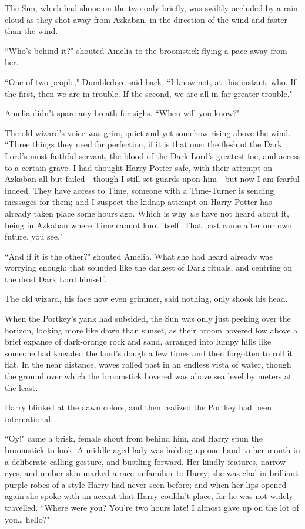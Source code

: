 \later

The Sun, which had shone on the two only briefly, was swiftly occluded by a rain cloud as they shot away from Azkaban, in the direction of the wind and faster than the wind.

``Who's behind it?" shouted Amelia to the broomstick flying a pace away from her.

``One of two people," Dumbledore said back, ``I know not, at this instant, who. If the first, then we are in trouble. If the second, we are all in far greater trouble."

Amelia didn't spare any breath for sighs. ``When will you know?"

The old wizard's voice was grim, quiet and yet somehow rising above the wind. ``Three things they need for perfection, if it is that one: the flesh of the Dark Lord's most faithful servant, the blood of the Dark Lord's greatest foe, and access to a certain grave. I had thought Harry Potter safe, with their attempt on Azkaban all but failed---though I still set guards upon him---but now I am fearful indeed. They have access to Time, someone with a Time-Turner is sending messages for them; and I suspect the kidnap attempt on Harry Potter has already taken place some hours ago. Which is why \emph{we} have not heard about it, being in Azkaban where Time cannot knot itself. That past came after our own future, you see."

``And if it is the other?" shouted Amelia. What she had heard already was worrying enough; that sounded like the darkest of Dark rituals, and centring on the dead Dark Lord himself.

The old wizard, his face now even grimmer, said nothing, only shook his head.

\later

When the Portkey's yank had subsided, the Sun was only just peeking over the horizon, looking more like dawn than sunset, as their broom hovered low above a brief expanse of dark-orange rock and sand, arranged into lumpy hills like someone had kneaded the land's dough a few times and then forgotten to roll it flat. In the near distance, waves rolled past in an endless vista of water, though the ground over which the broomstick hovered was above sea level by meters at the least.

Harry blinked at the dawn colors, and then realized the Portkey had been international.

``Oy!" came a brisk, female shout from behind him, and Harry spun the broomstick to look. A middle-aged lady was holding up one hand to her mouth in a deliberate calling gesture, and bustling forward. Her kindly features, narrow eyes, and umber skin marked a race unfamiliar to Harry; she was clad in brilliant purple robes of a style Harry had never seen before; and when her lips opened again she spoke with an accent that Harry couldn't place, for he was not widely travelled. ``Where were you? You're two hours late! I almost gave up on the lot of you{\ldots} hello?"

